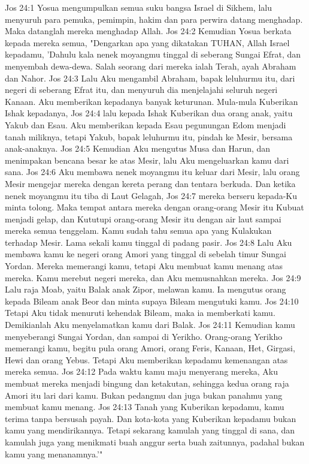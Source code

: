 Jos 24:1  Yosua mengumpulkan semua suku bangsa Israel di Sikhem, lalu menyuruh para pemuka, pemimpin, hakim dan para perwira datang menghadap. Maka datanglah mereka menghadap Allah.
Jos 24:2  Kemudian Yosua berkata kepada mereka semua, "Dengarkan apa yang dikatakan TUHAN, Allah Israel kepadamu, 'Dahulu kala nenek moyangmu tinggal di seberang Sungai Efrat, dan menyembah dewa-dewa. Salah seorang dari mereka ialah Terah, ayah Abraham dan Nahor.
Jos 24:3  Lalu Aku mengambil Abraham, bapak leluhurmu itu, dari negeri di seberang Efrat itu, dan menyuruh dia menjelajahi seluruh negeri Kanaan. Aku memberikan kepadanya banyak keturunan. Mula-mula Kuberikan Ishak kepadanya,
Jos 24:4  lalu kepada Ishak Kuberikan dua orang anak, yaitu Yakub dan Esau. Aku memberikan kepada Esau pegunungan Edom menjadi tanah miliknya, tetapi Yakub, bapak leluhurmu itu, pindah ke Mesir, bersama anak-anaknya.
Jos 24:5  Kemudian Aku mengutus Musa dan Harun, dan menimpakan bencana besar ke atas Mesir, lalu Aku mengeluarkan kamu dari sana.
Jos 24:6  Aku membawa nenek moyangmu itu keluar dari Mesir, lalu orang Mesir mengejar mereka dengan kereta perang dan tentara berkuda. Dan ketika nenek moyangmu itu tiba di Laut Gelagah,
Jos 24:7  mereka berseru kepada-Ku minta tolong. Maka tempat antara mereka dengan orang-orang Mesir itu Kubuat menjadi gelap, dan Kututupi orang-orang Mesir itu dengan air laut sampai mereka semua tenggelam. Kamu sudah tahu semua apa yang Kulakukan terhadap Mesir. Lama sekali kamu tinggal di padang pasir.
Jos 24:8  Lalu Aku membawa kamu ke negeri orang Amori yang tinggal di sebelah timur Sungai Yordan. Mereka memerangi kamu, tetapi Aku membuat kamu menang atas mereka. Kamu merebut negeri mereka, dan Aku memusnahkan mereka.
Jos 24:9  Lalu raja Moab, yaitu Balak anak Zipor, melawan kamu. Ia mengutus orang kepada Bileam anak Beor dan minta supaya Bileam mengutuki kamu.
Jos 24:10  Tetapi Aku tidak menuruti kehendak Bileam, maka ia memberkati kamu. Demikianlah Aku menyelamatkan kamu dari Balak.
Jos 24:11  Kemudian kamu menyeberangi Sungai Yordan, dan sampai di Yerikho. Orang-orang Yerikho memerangi kamu, begitu pula orang Amori, orang Feris, Kanaan, Het, Girgasi, Hewi dan orang Yebus. Tetapi Aku memberikan kepadamu kemenangan atas mereka semua.
Jos 24:12  Pada waktu kamu maju menyerang mereka, Aku membuat mereka menjadi bingung dan ketakutan, sehingga kedua orang raja Amori itu lari dari kamu. Bukan pedangmu dan juga bukan panahmu yang membuat kamu menang.
Jos 24:13  Tanah yang Kuberikan kepadamu, kamu terima tanpa bersusah payah. Dan kota-kota yang Kuberikan kepadamu bukan kamu yang mendirikannya. Tetapi sekarang kamulah yang tinggal di sana, dan kamulah juga yang menikmati buah anggur serta buah zaitunnya, padahal bukan kamu yang menanamnya.'"
